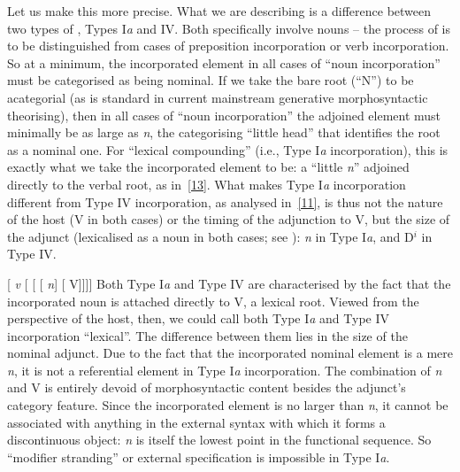 \documentclass[output=paper]{langsci/langscibook}
\begin{document}
\begin{refcontext}
Let us make this more precise. What we are describing is a difference between
two types of , Types I\emph{a} and IV. Both specifically
involve nouns -- the process of  is to be distinguished from
cases of preposition incorporation or verb incorporation. So at a minimum, the
incorporated element in all cases of \enquote{noun incorporation} must be
categorised as being nominal. If we take the bare root (\enquote{N}) to be
acategorial (as is standard in current mainstream generative morphosyntactic
theorising), then in all cases of \enquote{noun incorporation} the adjoined
element must minimally be as large as \emph{n}, the categorising
\enquote{little head} that identifies the root as a nominal one. For
\enquote{lexical compounding} (i.e., Type I\emph{a} incorporation), this is
exactly what we take the incorporated element to be: a \enquote{little
\emph{n}} adjoined directly to the verbal root, as in~\eqref{13}. What makes Type
I\emph{a} incorporation different from Type IV incorporation, as analysed
in~\eqref{11}, is thus not the nature of the host (V in both cases) or the timing
of the adjunction to V, but the size of the adjunct (lexicalised as a noun in
both cases; see ): \emph{n} in Type I\emph{a}, and D$^i$
in Type IV.

\ea  {}[ \emph{v}\tss{\{[+V], \Acc{}, \ldots{}\}} [
[ [ \hspace{-.7ex}\emph{n}\tss{\{[+N]\}}] [ \hspace{-.7ex}V]]]]\label{13}
\z
Both Type I\emph{a} and Type IV  are characterised by the
fact that the incorporated noun is attached directly to V, a lexical root.
Viewed from the perspective of the host, then, we could call both Type
I\emph{a} and Type IV incorporation \enquote{lexical}. The difference between
them lies in the size of the nominal adjunct. Due to the fact that the
incorporated nominal element is a mere \emph{n}, it is not a referential
element in Type I\emph{a} incorporation. The combination of \emph{n} and V is
entirely devoid of morphosyntactic content besides the adjunct's category
feature. Since the incorporated element is no larger than \emph{n}, it cannot
be associated with anything in the external syntax with which it forms a
discontinuous object: \emph{n} is itself the lowest point in the functional
sequence. So \enquote{modifier stranding} or external specification is
impossible in Type I\emph{a}.


\end{refcontext}
\end{document}

